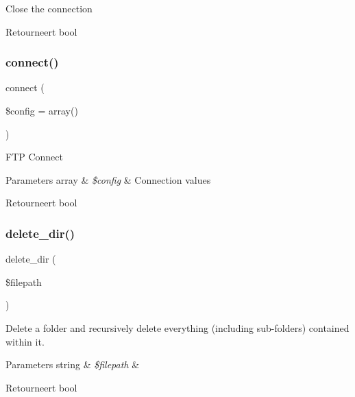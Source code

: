 Close the connection

\begin{DoxyReturn}{Retourneert}
bool 
\end{DoxyReturn}
\mbox{\label{class_c_i___f_t_p_ab2827759611aaaf0c59e69661122c534}} 
\subsubsection{\texorpdfstring{connect()}{connect()}}
{\footnotesize\ttfamily connect (\begin{DoxyParamCaption}\item[{}]{\$config = {\ttfamily array()} }\end{DoxyParamCaption})}

F\+TP Connect


\begin{DoxyParams}[1]{Parameters}
array & {\em \$config} & Connection values \\
\hline
\end{DoxyParams}
\begin{DoxyReturn}{Retourneert}
bool 
\end{DoxyReturn}
\mbox{\label{class_c_i___f_t_p_af09b3ab08984b145506dcff4f75a051c}} 
\subsubsection{\texorpdfstring{delete\_dir()}{delete\_dir()}}
{\footnotesize\ttfamily delete\+\_\+dir (\begin{DoxyParamCaption}\item[{}]{\$filepath }\end{DoxyParamCaption})}

Delete a folder and recursively delete everything (including sub-\/folders) contained within it.


\begin{DoxyParams}[1]{Parameters}
string & {\em \$filepath} & \\
\hline
\end{DoxyParams}
\begin{DoxyReturn}{Retourneert}
bool 
\end{DoxyReturn}
\mbox{\label{class_c_i___f_t_p_aad793fb503643d98b58426421718e18a}} 
